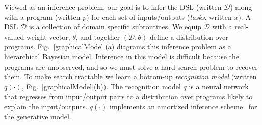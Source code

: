 \documentclass{article}
\begin{document}




Viewed as an inference problem,
our goal is to infer the DSL (written $\mathcal{D}$)
along with a program (written $p$) for each set of inputs/outputs (\emph{tasks}, written $x$).
A DSL $\mathcal{D}$ is a collection of domain specific subroutines.
We equip $\mathcal{D}$ with a real-valued weight vector, $\theta$, and together
$(\mathcal{D},\theta)$ define a distribution over programs.
Fig.~\ref{graphicalModel}(a) diagrams this inference problem as a hierarchical Bayesian model.
Inference in this model is
difficult because the programs are unobserved,
and so we must solve a hard search problem to recover them. To make
search tractable we learn a bottom-up \emph{recognition
  model} (written $q(\cdot )$, Fig.~\ref{graphicalModel}(b)).
The recognition model $q$ is a neural
network that regresses from input/output pairs to a distribution over
programs likely to explain the input/outputs. $q(\cdot )$ implements an amortized
inference
scheme~\cite{le2016inference} for the generative %
model.
\end{document}

